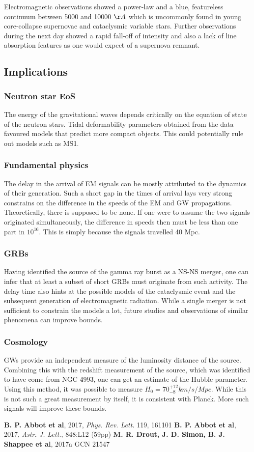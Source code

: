\documentclass[a4paper,12pt,onecolumn,twoside]{article}
\begin{document}
		Electromagnetic observations \cite{DroutShappee2017} showed a power-law and a blue, featureless continuum between 5000 and 10000 $\AA$ which is uncommonly found in young core-collapse supernovae and cataclysmic variable stars. Further observations during the next day showed a rapid fall-off of intensity and also a lack of line absorption features as one would expect of a supernova remnant.
	\subsection{Implications}
		\subsubsection{Neutron star EoS}
			The energy of the gravitational waves depends critically on the equation of state of the neutron stars. Tidal deformability parameters obtained from the data favoured models that predict more compact objects. This could potentially rule out models such as MS1.
		\subsubsection{Fundamental physics}
			The delay in the arrival of EM signals can be mostly attributed to the dynamics of their generation. Such a short gap in the times of arrival lays very strong constrains on the difference in the speeds of the EM and GW propagations. Theoretically, there is supposed to be none. If one were to assume the two signals originated simultaneously, the difference in speeds then must be less than one part in $10^{16}$. This is simply because the signals travelled 40 Mpc.
		\subsubsection{GRBs}
			Having identified the source of the gamma ray burst as a NS-NS merger, one can infer that at least a subset of short GRBs must originate from such activity. The delay time also hints at the possible models of the cataclysmic event and the subsequent generation of electromagnetic radiation. While a single merger is not sufficient to constrain the models a lot, future studies and observations of similar phenomena can improve bounds.
		\subsubsection{Cosmology}
			GWs provide an independent measure of the luminosity distance of the source. Combining this with the redshift measurement of the source, which was identified to have come from NGC 4993, one can get an estimate of the Hubble parameter. Using this method, it was possible to measure $H_0=70^{+12}_{-8}km/s/Mpc$. While this is not such a great measurement by itself, it is consistent with Planck. More such signals will improve these bounds.
\begin{thebibliography}{10}
     \textbf{B. P. Abbot et al}, 2017, \textit{Phys. Rev. Lett.} 119, 161101
     \textbf{B. P. Abbot et al}, 2017, \textit{Astr. J. Lett.}, 848:L12 (59pp)
    \textbf{M. R. Drout, J. D. Simon, B. J. Shappee et al}, 2017a GCN 21547
\end{thebibliography}
\end{document}
